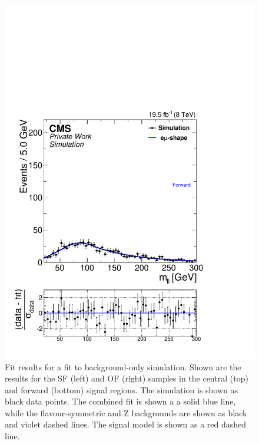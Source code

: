 \begin{figure}[hbp]
\begin{minipage}[t]{0.49\textwidth}
    \includegraphics[width=\textwidth]{plots/results/fit/mcFits/fit2012OFOS_ETHTriangle_SignalInclusive_Combined_Full2012_ETHTriangle_MC_Forward.pdf}
  \end{minipage}
  \caption{Fit results for a fit to background-only simulation. Shown are the results for the SF (left) and OF (right) samples in the central (top) and forward (bottom) signal regions. The simulation is shown as black data points. The combined fit is shown a a solid blue line, while the flavour-symmetric and Z backgrounds are shown as black and violet dashed lines. The signal model is shown as a red dashed line. }
  \label{fig:mc:bgOnly}
\end{figure}

